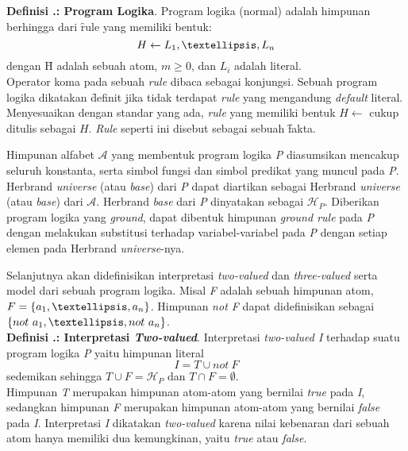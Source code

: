 \noindent\textbf{Definisi \thebabDuaNum.\thedefBabDua: Program Logika}. Program logika (normal) adalah himpunan berhingga dari \f{rule} yang memiliki bentuk:
\begin{displaymath}
	H \leftarrow L_1,\textellipsis,L_n
\end{displaymath}
dengan \f{H} adalah sebuah atom, $m \geq 0$, dan $L_i$ adalah literal.
\\

Operator koma pada sebuah \textit{rule} dibaca sebagai konjungsi. Sebuah program logika dikatakan \f{definit}  jika tidak terdapat \textit{rule} yang mengandung \textit{default} literal. Menyesuaikan dengan standar yang ada, \textit{rule} yang memiliki bentuk $H \leftarrow $ cukup ditulis sebagai $H$. \textit{Rule} seperti ini disebut sebagai sebuah \f{fakta}.

Himpunan alfabet $\mathcal{A}$ yang membentuk program logika \textit{P} diasumsikan mencakup seluruh konstanta, serta simbol fungsi dan simbol predikat yang muncul pada \textit{P}. Herbrand \textit{universe} (atau \textit{base}) dari \textit{P} dapat diartikan sebagai Herbrand \textit{universe} (atau \textit{base}) dari $\mathcal{A}$. Herbrand \textit{base} dari \textit{P} dinyatakan sebagai $\mathcal{H}_P$. Diberikan program logika yang \textit{ground}, dapat dibentuk himpunan \textit{ground rule} pada \textit{P} dengan melakukan substitusi terhadap variabel-variabel pada \textit{P} dengan setiap elemen pada Herbrand \textit{universe}-nya.

Selanjutnya akan didefinisikan interpretasi \textit{two-valued} dan \textit{three-valued} serta model dari sebuah program logika. Misal \textit{F} adalah sebuah himpunan atom, $F = \{a_1,\textellipsis,a_n\}$. Himpunan \textit{not F} dapat didefinisikan sebagai $\{not \ a_1,\textellipsis,not \ a_n\}$.
\\

\noindent \textbf{Definisi \thebabDuaNum.\thedefBabDua: Interpretasi \textit{Two-valued}}. Interpretasi \textit{two-valued I} terhadap suatu program logika \textit{P} yaitu himpunan literal
\begin{displaymath}
I = T \cup not \ F
\end{displaymath}
sedemikan sehingga $T \cup F = \mathcal{H}_P$ dan $T \cap F = \emptyset$.
\\

\noindent Himpunan \textit{T} merupakan himpunan atom-atom yang bernilai \textit{true} pada \textit{I}, sedangkan himpunan \textit{F} merupakan himpunan atom-atom yang bernilai \textit{false} pada \textit{I}. Interpretasi \textit{I} dikatakan \textit{two-valued} karena nilai kebenaran dari sebuah atom hanya memiliki dua kemungkinan, yaitu \textit{true} atau \textit{false}. 

